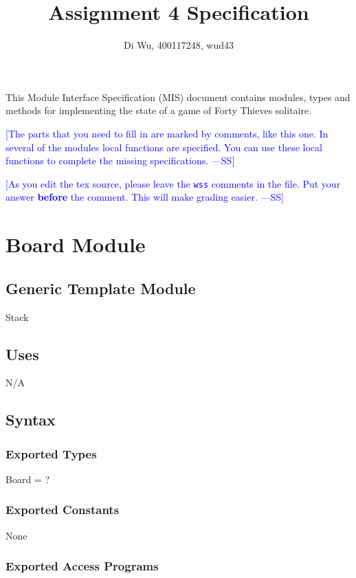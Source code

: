 \documentclass[12pt]{article}
\title{Assignment 4 Specification}
\author{Di Wu, 400117248, wud43}
\newcommand{\authornote}[3]{\textcolor{#1}{[#3 ---#2]}}
\newcommand{\authornote}[3]{}
\newcommand{\wss}[1]{\authornote{blue}{SS}{#1}}
\begin{document}
\maketitle
This Module Interface Specification (MIS) document contains modules, types and
methods for implementing the state of a game of Forty Thieves solitaire.

\wss{The parts that you need to fill in are marked by comments, like this one.
  In several of the modules local functions are specified.  You can use these
  local functions to complete the missing specifications.}

\wss{As you edit the tex source, please leave the \texttt{wss} comments in the
  file.  Put your answer \textbf{before} the comment.  This will make grading
  easier.}

\newpage

\section* {Board Module}

\subsection* {Generic Template Module}

Stack

\subsection* {Uses}

N/A

\subsection* {Syntax}

\subsubsection* {Exported Types}

Board = ?

\subsubsection* {Exported Constants}

None

\subsubsection* {Exported Access Programs}
\end{document}
